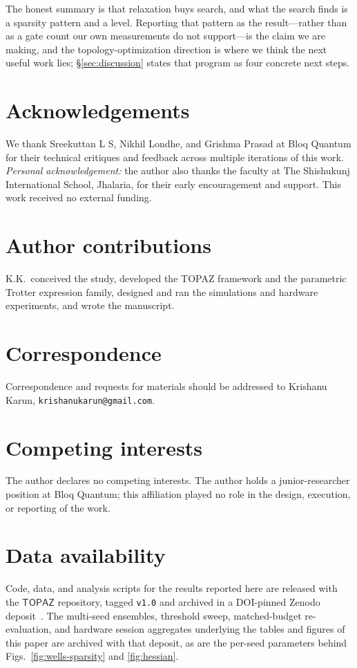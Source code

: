 \documentclass[twocolumn,aps,prl,superscriptaddress,showkeys]{revtex4-2}
\theoremstyle{plain}
\theoremstyle{definition}
\begin{document}
The honest summary is that relaxation buys search, and what the search finds is a sparsity pattern and a level. Reporting that pattern as the result---rather than as a gate count our own measurements do not support---is the claim we are making, and the topology-optimization direction is where we think the next useful work lies; \S\ref{sec:discussion} states that program as four concrete next steps.

\section*{Acknowledgements}
We thank Sreekuttan L S, Nikhil Londhe, and Grishma Prasad at Bloq Quantum for their technical critiques and feedback across multiple iterations of this work. \emph{Personal acknowledgement:} the author also thanks the faculty at The Shishukunj International School, Jhalaria, for their early encouragement and support. This work received no external funding.

\section*{Author contributions}
K.K.\ conceived the study, developed the TOPAZ framework and the parametric Trotter expression family, designed and ran the simulations and hardware experiments, and wrote the manuscript.

\section*{Correspondence}
Correspondence and requests for materials should be addressed to Krishanu Karun, \texttt{krishanukarun@gmail.com}.

\section*{Competing interests}
The author declares no competing interests. The author holds a junior-researcher position at Bloq Quantum; this affiliation played no role in the design, execution, or reporting of the work.

\section*{Data availability}
Code, data, and analysis scripts for the results reported here are released with the $\mathsf{TOPAZ}$ repository, tagged \texttt{v1.0} and archived in a DOI-pinned Zenodo deposit~\cite{TopazV1}. The multi-seed ensembles, threshold sweep, matched-budget re-evaluation, and hardware session aggregates underlying the tables and figures of this paper are archived with that deposit, as are the per-seed parameters behind Figs.~\ref{fig:wells-sparsity} and \ref{fig:hessian}.
\end{document}
